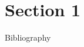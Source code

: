 \documentclass{article}
\begin{document}
\section{Section 1}
Bibliography \cite{Ref1}


\end{document}
